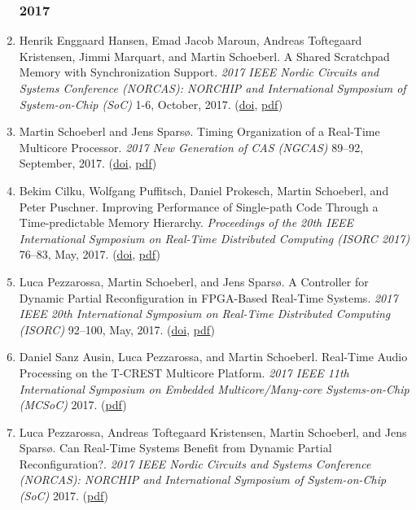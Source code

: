 \begin{enumerate}
\subsubsection*{2017}

\item Henrik Enggaard Hansen, Emad Jacob Maroun, Andreas Toftegaard Kristensen, Jimmi Marquart, and Martin Schoeberl.
 A Shared Scratchpad Memory with Synchronization Support.
 \emph{2017 IEEE Nordic Circuits and Systems Conference (NORCAS): NORCHIP and International Symposium of System-on-Chip (SoC)} 1-6, October, 2017.
(\href{http://dx.doi.org/10.1109/NORCHIP.2017.8124992}{doi}, \href{http://www.jopdesign.com/doc/spmsync.pdf}{pdf})

\item Martin Schoeberl and Jens Spars{\o}.
 Timing Organization of a Real-Time Multicore Processor.
 \emph{2017 New Generation of CAS (NGCAS)} 89--92, September, 2017.
(\href{http://dx.doi.org/10.1109/NGCAS.2017.73}{doi}, \href{http://www.jopdesign.com/doc/timeorg.pdf}{pdf})

\item Bekim Cilku, Wolfgang Puffitsch, Daniel Prokesch, Martin Schoeberl, and Peter Puschner.
 Improving Performance of Single-path Code Through a Time-predictable Memory Hierarchy.
 \emph{Proceedings of the 20th IEEE International Symposium on Real-Time Distributed Computing (ISORC 2017)} 76--83, May, 2017.
(\href{http://dx.doi.org/10.1109/ISORC.2017.17}{doi}, \href{http://www.jopdesign.com/doc/patpref.pdf}{pdf})

\item Luca Pezzarossa, Martin Schoeberl, and Jens Spars{\o}.
 A Controller for Dynamic Partial Reconfiguration in FPGA-Based Real-Time Systems.
 \emph{2017 IEEE 20th International Symposium on Real-Time Distributed Computing (ISORC)} 92--100, May, 2017.
(\href{http://dx.doi.org/10.1109/ISORC.2017.3}{doi}, \href{http://www.jopdesign.com/doc/icap-ctrl.pdf}{pdf})

\item Daniel Sanz Ausin, Luca Pezzarossa, and Martin Schoeberl.
 Real-Time Audio Processing on the T-CREST Multicore Platform.
 \emph{2017 IEEE 11th International Symposium on Embedded Multicore/Many-core Systems-on-Chip (MCSoC)} 2017.
(\href{http://www.jopdesign.com/doc/dspapp.pdf}{pdf})

\item Luca Pezzarossa, Andreas Toftegaard Kristensen, Martin Schoeberl, and Jens Spars{\o}.
 Can Real-Time Systems Benefit from Dynamic Partial Reconfiguration?.
 \emph{2017 IEEE Nordic Circuits and Systems Conference (NORCAS): NORCHIP and International Symposium of System-on-Chip (SoC)} 2017.
(\href{http://www.jopdesign.com/doc/dpr-mcp.pdf}{pdf})


\end{enumerate}
